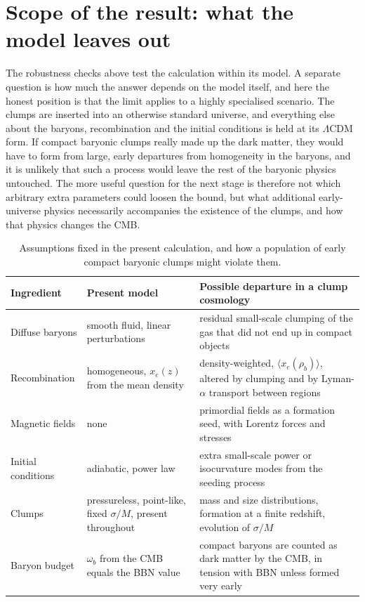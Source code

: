 \documentclass[11pt,a4paper]{article}
\begin{document}
\section{Scope of the result: what the model leaves out}
\label{sec:scope}

The robustness checks above test the calculation within its model. A separate question is how much the answer depends on the model itself, and here the honest position is that the limit applies to a highly specialised scenario. The clumps are inserted into an otherwise standard universe, and everything else about the baryons, recombination and the initial conditions is held at its $\Lambda$CDM form. If compact baryonic clumps really made up the dark matter, they would have to form from large, early departures from homogeneity in the baryons, and it is unlikely that such a process would leave the rest of the baryonic physics untouched. The more useful question for the next stage is therefore not which arbitrary extra parameters could loosen the bound, but what additional early-universe physics necessarily accompanies the existence of the clumps, and how that physics changes the CMB.

\begin{table}[t]
\centering
\caption{Assumptions fixed in the present calculation, and how a population of early compact baryonic clumps might violate them.}
\label{tab:assumptions}
\begin{tabular}{p{}p{}p{}}
\toprule
Ingredient & Present model & Possible departure in a clump cosmology \\
\midrule
Diffuse baryons & smooth fluid, linear perturbations & residual small-scale clumping of the gas that did not end up in compact objects \\
Recombination & homogeneous, $x_e(z)$ from the mean density & density-weighted, $\langle x_e(\rho_b)\rangle$, altered by clumping and by Lyman-$\alpha$ transport between regions \\
Magnetic fields & none & primordial fields as a formation seed, with Lorentz forces and stresses \\
Initial conditions & adiabatic, power law & extra small-scale power or isocurvature modes from the seeding process \\
Clumps & pressureless, point-like, fixed $\sigma/M$, present throughout & mass and size distributions, formation at a finite redshift, evolution of $\sigma/M$ \\
Baryon budget & $\omega_b$ from the CMB equals the BBN value & compact baryons are counted as dark matter by the CMB, in tension with BBN unless formed very early \\
\bottomrule
\end{tabular}
\end{table}
\end{document}
